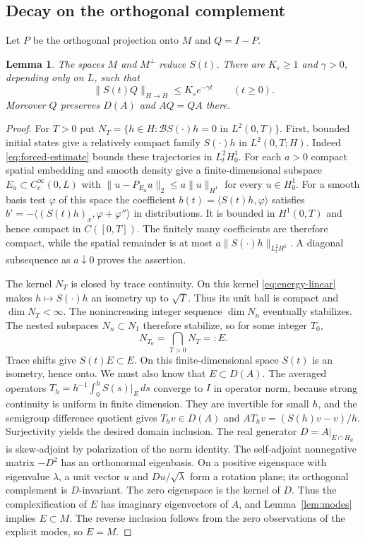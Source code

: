 \documentclass[11pt]{article}
\newtheorem{lemma}[theorem]{Lemma}
\theoremstyle{remark}\newtheorem{remark}[theorem]{Remark}
\numberwithin{equation}{section}
\begin{document}
\subsection{Decay on the orthogonal complement}
Let $P$ be the orthogonal projection onto $M$ and $Q=I-P$.
\begin{lemma}\label{lem:stable}
The spaces $M$ and $M^\perp$ reduce $S(t)$. There are $K_s\ge1$ and
$\gamma>0$, depending only on $L$, such that
\begin{equation}\label{eq:stable}
 \|S(t)Q\|_{H\to H}\le K_s e^{-\gamma t}\qquad(t\ge0).
\end{equation}
Moreover $Q$ preserves $D(A)$ and $AQ=QA$ there.
\end{lemma}
\begin{proof}
For $T>0$ put $N_T=\{h\in H:\mathcal BS(\cdot)h=0\text{ in }L^2(0,T)\}$.
First, bounded initial states give a relatively compact family
$S(\cdot)h$ in $L^2(0,T;H)$. Indeed \eqref{eq:forced-estimate} bounds
these trajectories in $L^2_tH^1_0$.
For each $a>0$ compact spatial embedding and smooth density give a finite-dimensional
subspace $E_a\subset C^\infty_c(0,L)$ with
$\|u-P_{E_a}u\|_2\le a\|u\|_{H^1}$ for every $u\in H^1_0$.
For a smooth basis test $\varphi$ of this space the coefficient
$b(t)=\langle S(t)h,\varphi\rangle$ satisfies
$b'=-\langle (S(t)h)_x,\varphi+\varphi''\rangle$ in distributions.
It is bounded in $H^1(0,T)$ and hence compact in $C([0,T])$.
The finitely many coefficients are therefore compact, while the spatial
remainder is at most $a\|S(\cdot)h\|_{L^2_tH^1}$.
A diagonal subsequence as $a\downarrow0$ proves the assertion.

The kernel $N_T$ is closed by trace continuity. On this kernel
\eqref{eq:energy-linear} makes $h\mapsto S(\cdot)h$ an isometry up to
$\sqrt T$. Thus its unit ball is compact and $\dim N_T<\infty$.
The nonincreasing integer sequence $\dim N_n$ eventually stabilizes.
The nested subspaces $N_n\subset N_1$ therefore stabilize, so for some integer $T_0$,
\[
 N_{T_0}=\bigcap_{T>0}N_T=:E.
\]
Trace shifts give $S(t)E\subset E$. On this finite-dimensional space $S(t)$ is an
isometry, hence onto. We must also know that $E\subset D(A)$.
The averaged operators $T_h=h^{-1}\int_0^h S(s)|_E\,ds$ converge to $I$
in operator norm, because strong continuity is uniform in finite dimension.
They are invertible for small $h$, and the semigroup difference quotient gives
$T_hv\in D(A)$ and $AT_hv=(S(h)v-v)/h$.
Surjectivity yields the desired domain inclusion.
The real generator $D=A|_{E\cap H_{\mathbb R}}$ is skew-adjoint by
polarization of the norm identity. The self-adjoint nonnegative matrix
$-D^2$ has an orthonormal eigenbasis. On a positive eigenspace with eigenvalue
$\lambda$, a unit vector $u$ and $Du/\sqrt\lambda$ form a rotation plane;
its orthogonal complement is $D$-invariant. The zero eigenspace is the kernel
of $D$. Thus the complexification of $E$ has imaginary eigenvectors of $A$,
and Lemma~\ref{lem:modes} implies $E\subset M$. The reverse inclusion
follows from the zero observations of the explicit modes, so $E=M$.


\end{proof}
\end{document}
